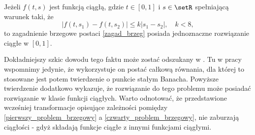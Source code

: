 \begin{theorem}
Jeżeli $f(t,s)$ jest funkcją ciągłą, gdzie $t \in [0,1]$ i $s \in \setR$ spełniającą warunek taki, że
$$
|f(t,s_1) - f(t,s_2)| \leq k|s_1 - s_2|, \quad k<8,
$$
to zagadnienie brzegowe postaci \eqref{zagad_brzeg} posiada jednoznaczne rozwiązanie ciągłe w $[0,1]$. 
\end{theorem}
Dokładniejszy szkic dowodu tego faktu może zostać odszukany w \citep{kincaid1991numerical}. Tu w pracy wspomnimy jedynie, że wykorzystuje on postać całkową równania, dla której to stosowane jest potem twierdzenie o punkcie stałym Banacha. Powyższe twierdzenie dodatkowo wykazuje, że rozwiązanie do tego problemu może posiadać rozwiązanie w klasie funkcji ciągłych. Warto odnotować, że przedstawione wcześniej transformacje opisujące zależności pomiędzy \eqref{pierwszy_problem_brzegowy} a \eqref{czwarty_problem_brzegowy}, nie zaburzają ciągłości - gdyż składają funkcje ciągłe z innymi funkcjami ciągłymi. 

